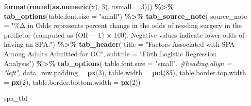 \documentclass[
]{article}
\newenvironment{Shaded}{\begin{snugshade}}{\end{snugshade}}
\newcommand{\AttributeTok}[1]{\textcolor[rgb]{0.13,0.29,0.53}{#1}}
\newcommand{\CommentTok}[1]{\textcolor[rgb]{0.56,0.35,0.01}{\textit{#1}}}
\newcommand{\DecValTok}[1]{\textcolor[rgb]{0.00,0.00,0.81}{#1}}
\newcommand{\FunctionTok}[1]{\textcolor[rgb]{0.13,0.29,0.53}{\textbf{#1}}}
\newcommand{\NormalTok}[1]{#1}
\newcommand{\SpecialCharTok}[1]{\textcolor[rgb]{0.81,0.36,0.00}{\textbf{#1}}}
\newcommand{\StringTok}[1]{\textcolor[rgb]{0.31,0.60,0.02}{#1}}
\begin{document}
\begin{Shaded}
\begin{Highlighting}[]
                            \FunctionTok{format}\NormalTok{(}\FunctionTok{round}\NormalTok{(}\FunctionTok{as.numeric}\NormalTok{(x), }\DecValTok{3}\NormalTok{), }\AttributeTok{nsmall =} \DecValTok{3}\NormalTok{))) }\SpecialCharTok{\%\textgreater{}\%}
  \FunctionTok{tab\_options}\NormalTok{(}\AttributeTok{table.font.size =} \StringTok{"small"}\NormalTok{) }\SpecialCharTok{\%\textgreater{}\%}
  \FunctionTok{tab\_source\_note}\NormalTok{(}
    \AttributeTok{source\_note =} \StringTok{"\%Δ in Odds represents percent change in the odds of needing surgery}
\StringTok{    in the predictor (computed as (OR − 1) × 100). Negative values indicate lower}
\StringTok{    odds of having an SPA."}\NormalTok{) }\SpecialCharTok{\%\textgreater{}\%} 
  \FunctionTok{tab\_header}\NormalTok{(}
    \AttributeTok{title =} \StringTok{"Factors Associated with SPA Among Adults Admitted for OC"}\NormalTok{,}
    \AttributeTok{subtitle =} \StringTok{"Firth Logistic Regression Analysis"}\NormalTok{) }\SpecialCharTok{\%\textgreater{}\%} 
  \FunctionTok{tab\_options}\NormalTok{(}
    \AttributeTok{table.font.size =} \StringTok{"small"}\NormalTok{,}
    \CommentTok{\#heading.align = "left",}
    \AttributeTok{data\_row.padding =} \FunctionTok{px}\NormalTok{(}\DecValTok{3}\NormalTok{),}
    \AttributeTok{table.width =} \FunctionTok{pct}\NormalTok{(}\DecValTok{85}\NormalTok{),}
    \AttributeTok{table.border.top.width =} \FunctionTok{px}\NormalTok{(}\DecValTok{2}\NormalTok{),}
    \AttributeTok{table.border.bottom.width =} \FunctionTok{px}\NormalTok{(}\DecValTok{2}\NormalTok{))}

\NormalTok{spa\_tbl}
\end{Highlighting}
\end{Shaded}
\end{document}

